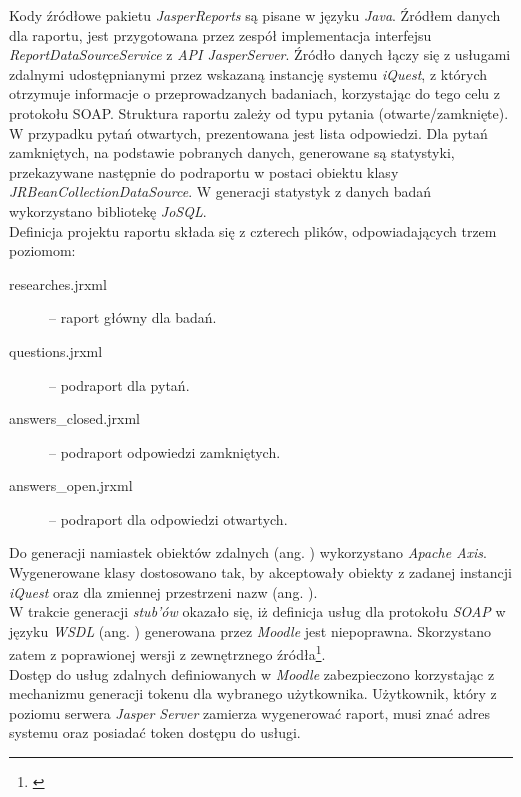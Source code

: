 Kody źródłowe pakietu \textit{JasperReports} są pisane w języku \textit{Java}. Źródłem danych dla raportu, jest przygotowana przez zespół implementacja interfejsu \textit{ReportDataSourceService} z \textit{API JasperServer}. Źródło danych łączy się z usługami zdalnymi udostępnianymi przez wskazaną instancję systemu \textit{iQuest}, z których otrzymuje informacje o przeprowadzanych badaniach, korzystając do tego celu z protokołu SOAP. Struktura raportu zależy od typu pytania (otwarte\slash zamknięte). W przypadku pytań otwartych, prezentowana jest lista odpowiedzi. Dla pytań zamkniętych, na podstawie pobranych danych, generowane są statystyki, przekazywane następnie do podraportu w postaci obiektu klasy \textit{JRBeanCollectionDataSource}. W generacji statystyk z danych badań wykorzystano bibliotekę \textit{JoSQL}. \\

Definicja projektu raportu składa się z czterech plików, odpowiadających trzem poziomom:

\begin{description}
\item[researches.jrxml] -- raport główny dla badań.
\item[questions.jrxml] -- podraport dla pytań.
\item[answers\_closed.jrxml] -- podraport odpowiedzi zamkniętych.
\item[answers\_open.jrxml] -- podraport dla odpowiedzi otwartych.
\end{description}

Do generacji namiastek obiektów zdalnych (ang. ) wykorzystano \textit{Apache Axis}. Wygenerowane klasy dostosowano tak, by akceptowały obiekty z zadanej instancji \textit{iQuest} oraz dla zmiennej przestrzeni nazw (ang. ). \\

W trakcie generacji \textit{stub'ów} okazało się, iż definicja usług dla protokołu \textit{SOAP} w języku \textit{WSDL} (ang. ) generowana przez \textit{Moodle} jest niepoprawna. Skorzystano zatem z poprawionej wersji z zewnętrznego źródła\footnote{\cite{GITHUB:MoodleSoap}}. \\

Dostęp do usług zdalnych definiowanych w \textit{Moodle} zabezpieczono korzystając z mechanizmu generacji tokenu dla wybranego użytkownika. Użytkownik, który z poziomu serwera \textit{Jasper Server} zamierza wygenerować raport, musi znać adres systemu oraz posiadać token dostępu do usługi.

